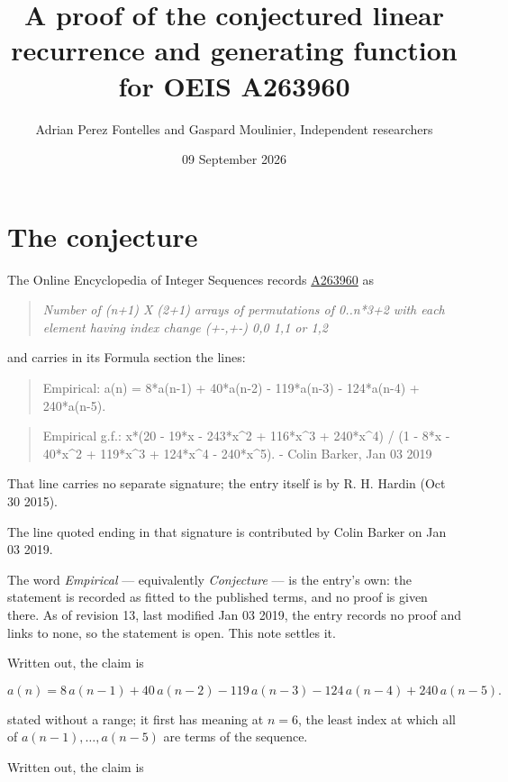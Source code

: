\documentclass[11pt]{article}
\title{A proof of the conjectured linear recurrence and generating function for OEIS A263960}
\author{Adrian Perez Fontelles and Gaspard Moulinier, Independent researchers}
\date{09 September 2026}
\theoremstyle{definition}
\begin{document}
\maketitle
\section{The conjecture}

The Online Encyclopedia of Integer Sequences records \href{https://oeis.org/A263960}{A263960} as

\begin{quote}\itshape Number of (n+1) X (2+1) arrays of permutations of 0..n*3+2 with each element having index change (+-,+-) 0,0 1,1 or 1,2\end{quote}

and carries in its Formula section the lines:

\begin{quote}\ttfamily Empirical: a(n) = 8*a(n-1) + 40*a(n-2) - 119*a(n-3) - 124*a(n-4) + 240*a(n-5).\end{quote}

\begin{quote}\ttfamily Empirical g.f.: x*(20 - 19*x - 243*x\textasciicircum{}2 + 116*x\textasciicircum{}3 + 240*x\textasciicircum{}4) / (1 - 8*x - 40*x\textasciicircum{}2 + 119*x\textasciicircum{}3 + 124*x\textasciicircum{}4 - 240*x\textasciicircum{}5). - Colin Barker, Jan 03 2019\end{quote}

That line carries no separate signature; the entry itself is by R. H. Hardin (Oct 30 2015).

The line quoted ending in that signature is contributed by Colin Barker on Jan 03 2019.

The word {\itshape Empirical} --- equivalently {\itshape Conjecture} --- is the entry's own: the statement is recorded as fitted to the published terms, and no proof is given there. As of revision 13, last modified Jan 03 2019, the entry records no proof and links to none, so the statement is open. This note settles it.

Written out, the claim is

\[a(n) = 8\,a(n-1) + 40\,a(n-2) - 119\,a(n-3) - 124\,a(n-4) + 240\,a(n-5).\]

stated without a range; it first has meaning at $n = 6$, the least index at which all of $a(n-1),\dots,a(n-5)$ are terms of the sequence.

Written out, the claim is
\end{document}
